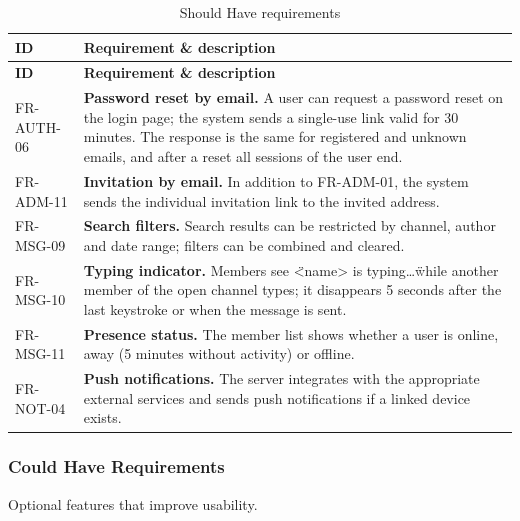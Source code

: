 \documentclass[
    english, %
]{VUMIFPSkursinis}
\newcommand{\frhead}{\textbf{ID} & \textbf{Requirement \& description} \\ \hline}
\begin{document}
\begin{longtable}{|p{}|p{}|}
\caption{Should Have requirements}\\ \hline
\frhead
\endfirsthead
\hline \frhead
\endhead
FR-AUTH-06 & \textbf{Password reset by email.} A user can request a password reset on the login page; the system sends a single-use link valid for 30 minutes. The response is the same for registered and unknown emails, and after a reset all sessions of the user end. \\ \hline
FR-ADM-11 & \textbf{Invitation by email.} In addition to FR-ADM-01, the system sends the individual invitation link to the invited address. \\ \hline
FR-MSG-09 & \textbf{Search filters.} Search results can be restricted by channel, author and date range; filters can be combined and cleared. \\ \hline
FR-MSG-10 & \textbf{Typing indicator.} Members see \"<name> is typing\ldots\" while another member of the open channel types; it disappears 5 seconds after the last keystroke or when the message is sent. \\ \hline
FR-MSG-11 & \textbf{Presence status.} The member list shows whether a user is online, away (5 minutes without activity) or offline. \\ \hline
FR-NOT-04 & \textbf{Push notifications.} The server integrates with the appropriate external services and sends push notifications if a linked device exists. \\ \hline
\end{longtable}

\subsubsection{Could Have Requirements}
Optional features that improve usability.
\end{document}
